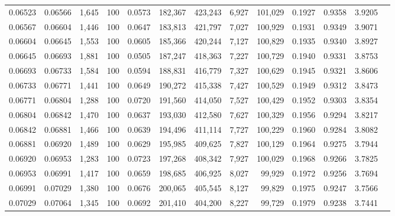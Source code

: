 \begin{tabular}{rrrrrrrrrrrrr}
0.06523 & 0.06566 & 1,645 & 100 &                                     0.0573 & 182,367 & 423,243 &   6,927 & 101,029 & 0.1927 & 0.9358 & 3.9205 \\
0.06567 & 0.06604 & 1,446 & 100 &                                     0.0647 & 183,813 & 421,797 &   7,027 & 100,929 & 0.1931 & 0.9349 & 3.9071 \\
0.06604 & 0.06645 & 1,553 & 100 &                                     0.0605 & 185,366 & 420,244 &   7,127 & 100,829 & 0.1935 & 0.9340 & 3.8927 \\
0.06645 & 0.06693 & 1,881 & 100 &                                     0.0505 & 187,247 & 418,363 &   7,227 & 100,729 & 0.1940 & 0.9331 & 3.8753 \\
0.06693 & 0.06733 & 1,584 & 100 &                                     0.0594 & 188,831 & 416,779 &   7,327 & 100,629 & 0.1945 & 0.9321 & 3.8606 \\
0.06733 & 0.06771 & 1,441 & 100 &                                     0.0649 & 190,272 & 415,338 &   7,427 & 100,529 & 0.1949 & 0.9312 & 3.8473 \\
0.06771 & 0.06804 & 1,288 & 100 &                                     0.0720 & 191,560 & 414,050 &   7,527 & 100,429 & 0.1952 & 0.9303 & 3.8354 \\
0.06804 & 0.06842 & 1,470 & 100 &                                     0.0637 & 193,030 & 412,580 &   7,627 & 100,329 & 0.1956 & 0.9294 & 3.8217 \\
0.06842 & 0.06881 & 1,466 & 100 &                                     0.0639 & 194,496 & 411,114 &   7,727 & 100,229 & 0.1960 & 0.9284 & 3.8082 \\
0.06881 & 0.06920 & 1,489 & 100 &                                     0.0629 & 195,985 & 409,625 &   7,827 & 100,129 & 0.1964 & 0.9275 & 3.7944 \\
0.06920 & 0.06953 & 1,283 & 100 &                                     0.0723 & 197,268 & 408,342 &   7,927 & 100,029 & 0.1968 & 0.9266 & 3.7825 \\
0.06953 & 0.06991 & 1,417 & 100 &                                     0.0659 & 198,685 & 406,925 &   8,027 &  99,929 & 0.1972 & 0.9256 & 3.7694 \\
0.06991 & 0.07029 & 1,380 & 100 &                                     0.0676 & 200,065 & 405,545 &   8,127 &  99,829 & 0.1975 & 0.9247 & 3.7566 \\
0.07029 & 0.07064 & 1,345 & 100 &                                     0.0692 & 201,410 & 404,200 &   8,227 &  99,729 & 0.1979 & 0.9238 & 3.7441 \\

\end{tabular}
